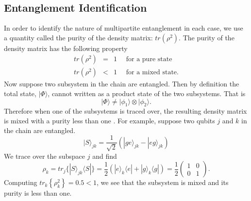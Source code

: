 \subsection{Entanglement Identification}
%
In order to identify the nature of multipartite entanglement in each case, we use a quantity called the purity of the density matrix: $tr
\left( \rho^2 \right)$. The purity of the density matrix has the following property
 \begin{eqnarray}
 tr( \rho^2 ) & = & 1 \quad\text{ for a pure state} \nonumber \\
  tr( \rho^2 ) & < & 1 \quad\text{ for a mixed state}. \nonumber
 \end{eqnarray}
Now suppose two subsystem in the chain are entangled. Then by definition the total state, $| \Phi \rangle$, cannot written as a product state of the two subsystems. That is 
 \begin{equation}
 |\Phi \rangle \neq |\phi_1 \rangle \otimes |\phi_2 \rangle.
 \end{equation}
 Therefore when one of the subsystems is traced over, the resulting density matrix is mixed with a purity less than one \cite{Entangle_Time_Scale}. For example, suppose two qubits $j$ and $k$ in the chain are entangled.
\begin{equation}
| S \rangle_{j k } = \frac{1}{\sqrt{2}} \left( | g e \rangle_{j k } - | e g \rangle_{ j k } \right)
\end{equation}
We trace over the subspace $j$ and find
\begin{equation}
    \rho_{k} = tr_j \lbrace | S \rangle_{j k }\langle S | \rbrace = \frac{1}{2} \left(| e \rangle_k \langle e | + | g \rangle_k \langle g |\right) = \frac{1}{2} \left( \begin{array}{cc}
       1  & 0 \\
       0  & 1
    \end{array} \right).
\end{equation}
Computing $tr_k \left\lbrace \rho_k^2 \right\rbrace = 0.5 < 1 $, we see that the subsystem is mixed and its purity is less than one.
%

